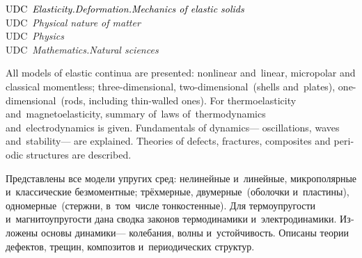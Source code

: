 \begin{minipage}[b]{0.92\linewidth}
{\begin{otherlanguage}{russian}
\end{otherlanguage}

\vspace{\baselineskip}

\begin{otherlanguage}{english}

{\footnotesize%
\textcolor{black}{UDC~\emph{Elasticity.\:Deformation.\:Mechanics of elastic solids}}\\
\textcolor{black!50}{UDC~\emph{Physical nature of matter}}\\
\textcolor{black!40}{UDC~\emph{Physics}}\\
\textcolor{black!30}{UDC~\emph{Mathematics.\:Natural sciences}}%
\par}

\end{otherlanguage}

\vspace{0.25\paperheight}

\begin{otherlanguage}{english}

All models of elastic continua are presented: nonlinear and~\hbox{linear}, micropolar and classical momentless; three-di\-men\-sion\-al, two-di\-men\-sion\-al~(shells and~plates), one-di\-men\-sion\-al~(rods, including thin\hbox{-}walled ones). For thermo\-elasticity and~magneto\-elasticity, summary of~laws of~thermo\-dynamics and~electro\-dynamics is given. Fundamentals of dynamics\:--- oscillations, waves and~stability\:--- are explained. Theories of defects, fractures, composites and periodic structures are described.


\end{otherlanguage}

\vspace{1.2\baselineskip}

\begin{otherlanguage}{russian}

Представлены все модели упругих сред: нелинейные и~линейные, микрополярные и~классические безмоментные; трёх\-мерные, дву\-мерные~(оболочки и~пластины), одно\-мерные~(стержни, в~том~числе тонко\-стен\-ные). Для термо\-упругости и~магнито\-упругости дана сводка законов термо\-динамики и~электро\-динамики. Изложены основы динамики\:--- колебания, волны и~устойчивость. Описаны теории дефектов, трещин, композитов и~периодических структур.

\end{otherlanguage}

}
\end{minipage}

\thispagestyle{empty}

\newpage
